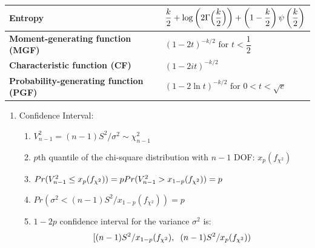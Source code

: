 \begin{alternateColorTable}
\begin{longtable}{|m{6cm}|p{9cm}|}
    \textbf{Entropy} &
    ${\displaystyle {{\dfrac {k}{2}} +\log \left(2\Gamma {\Bigl (}{\dfrac {k}{2}}{\Bigr )}\right)+\left(1-{\dfrac {k}{2}}\right)\psi \left({\dfrac {k}{2}}\right)}}$
    \\[1ex] \hline

    \textbf{Moment-generating function (MGF)} &
    ${\displaystyle (1-2t)^{-k/2}{\text{ for }}t<{\dfrac {1}{2}}\;}$
    \\[1ex] \hline

    \textbf{Characteristic function (CF)} &
    ${\displaystyle (1-2it)^{-k/2}}$
    \\[1ex] \hline

    \textbf{Probability-generating function (PGF)} &
    ${\displaystyle (1-2\ln t)^{-k/2}{\text{ for }}0<t<{\sqrt {e}}\;}$
    \\[1ex] \hline

\end{longtable}
\renewcommand{\arraystretch}{1}
\end{alternateColorTable}

\begin{enumerate}[itemsep=0.2cm]
    \item Confidence Interval:
    \begin{enumerate}[itemsep=0.2cm]
        \item $V_{n-1}^2 = (n-1)S^2/\sigma^2 \sim \chi_{n-1}^2$

        \item $p$th quantile of the chi-square distribution with $n - 1$ DOF: $x_p(f_{\chi^2})$

        \item $
            \hfill
            Pr(V_{n-1}^2 \leq x_p(f_{\chi^2})) = p
            \hfill
            Pr(V_{n-1}^2 > x_{1-p}(f_{\chi^2})) = p
            \hfill
        $

        \item $
            Pr(\sigma^2 < (n-1)S^2/x_{1-p}(f_{\chi^2})) = p 
        $

        \item $1 - 2p$ confidence interval for the variance $\sigma^2$ is:
        \[[
            (n-1)S^2/x_{1-p}(f_{\chi^2}), 
            \hspace{0.2cm}
            (n-1)S^2/x_{p}(f_{\chi^2})
        )\]

    \end{enumerate}

\end{enumerate}



